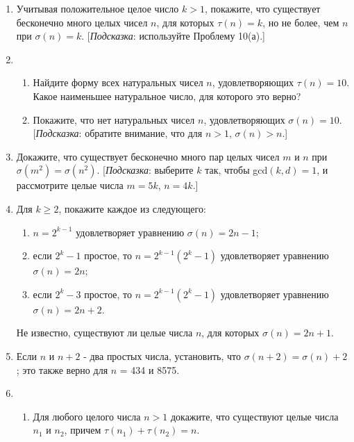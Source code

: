 \documentclass[11pt]{article}
\begin{document}
\begin{enumerate}
\begin{enumerate}
    	\item  Если $n > 1$ является составным числом, то $\sigma(n)>n + \sqrt{n}$. [{\itshape Подсказка}: Пусть $d\mid n$, где $1 < d < n$, поэтому $1 < n\mid d < n$. Если $d \le \sqrt{n}$, то $n\mid d \ge \sqrt{n}$.]
    \end{enumerate}
    \item Учитывая положительное целое число $k > 1$, покажите, что существует бесконечно много целых чисел $n$, для которых $\tau(n)=k$, но не более, чем $n$ при $\sigma(n)=k$. [{\itshape Подсказка}: используйте Проблему 10(а).]
    \item 
    \begin{enumerate} 
    	\item Найдите форму всех натуральных чисел $n$, удовлетворяющих $\tau(n) = 10$. Какое наименьшее натуральное число, для которого это верно?
    	\item Покажите, что нет натуральных чисел $n$, удовлетворяющих $\sigma(n) = 10$. [{\itshape Подсказка}: обратите внимание, что для $n > 1$, $\sigma(n) > n$.]
    \end{enumerate}
    \item Докажите, что существует бесконечно много пар целых чисел $m$ и $n$ при $\sigma(m^{2}) = \sigma(n^{2}).$ [{\itshape Подсказка}: выберите $k$ так, чтобы gcd$(k,d) = 1$, и рассмотрите целые числа $m = 5k$, $n = 4k$.]
    \item Для $k\ge 2 $, покажите каждое из следующего:
    \begin{enumerate} 
    	\item $n = 2^{k-1}$ удовлетворяет уравнению $\sigma(n) = 2n - 1$;
    	\item если $2^{k}-1$ простое, то $n = 2^{k-1}\left(2^{k}-1\right)$ удовлетворяет уравнению $\sigma(n) = 2n$;
    	\item если $2^{k} - 3$ простое, то $n = 2^{k-1}\left(2^{k}-1\right)$ удовлетворяет уравнению $\sigma(n) = 2n+2$. 
    \end{enumerate}
    	Не известно, существуют ли целые числа $n$, для которых $\sigma(n) = 2n + 1$.
    	\item Если $n$ и $n+2$ - два простых числа, установить, что $\sigma (n+2) = \sigma (n)+2$; это также верно для $n$ = 434 и 8575.
    	\item 
    	\begin{enumerate} 
    		\item Для любого целого числа $n > 1$ докажите, что существуют целые числа $n_{1}$ и $n_{2}$, причем $\tau(n_{1})+\tau(n_{2}) = n$.

\end{enumerate}
\end{enumerate}
\end{document}
